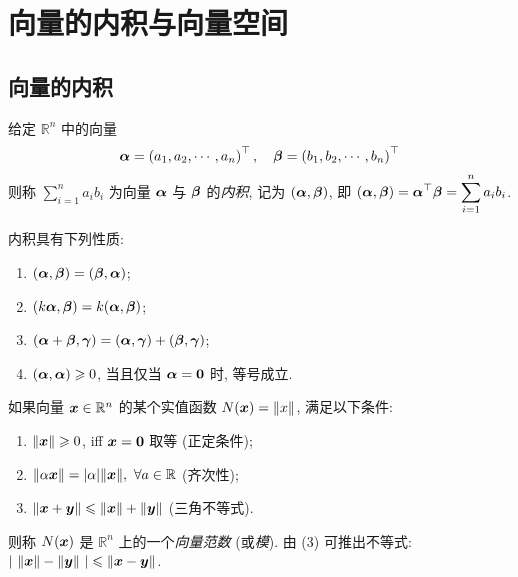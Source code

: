 \section{向量的内积与向量空间}

\subsection{向量的内积}

\begin{definition}[向量的内积]
    给定 $ \mathbb{R}^{n} $ 中的向量
    $$\vb*{\alpha}=\left(a_{1}, a_{2}, \cdots, a_{n}\right)^{\top}, \quad \vb*{\beta}=\left(b_{1}, b_{2}, \cdots, b_{n}\right)^{\top}$$
    则称 $\displaystyle \sum_{i=1}^{n} a_{i} b_{i} $ 为向量 $ \vb*{\alpha} $ 与 $ \vb*{\beta} $ 的\textit{内积}, 记为 $ (\vb*{\alpha}, \vb*{\beta}) $, 即 $ \displaystyle(\vb*{\alpha}, \vb*{\beta})=\vb*{\alpha}^{\top} \vb*{\beta}=\sum_{i=1}^{n} a_{i} b_{i} $.
\end{definition}

内积具有下列性质:
\begin{enumerate}[label=(\arabic{*})]
    \item $(\vb*{\alpha}, \vb*{\beta})=(\vb*{\beta}, \vb*{\alpha}) $;
    \item $(k \vb*{\alpha}, \vb*{\beta})=k(\vb*{\alpha}, \vb*{\beta}) $;
    \item $(\vb*{\alpha}+\vb*{\beta}, \vb*{\gamma})=(\vb*{\alpha}, \vb*{\gamma})+(\vb*{\beta}, \vb*{\gamma}) $;
    \item $(\vb*{\alpha}, \vb*{\alpha}) \geqslant 0 $, 当且仅当 $ \vb*{\alpha}=\vb*{0} $ 时, 等号成立.
\end{enumerate}

\begin{definition}[向量的范数]
    如果向量 $\vb*{x}\in \mathbb{R}^{n}$ 的某个实值函数 $N(\vb*{x})=\norm{x}$, 满足以下条件:
    \begin{enumerate}[label=(\arabic{*})]
        \item $\norm{\vb*{x}}\geqslant 0$, iff $\vb*{x}=\vb*{0}$ 取等 (正定条件);
        \item $\norm{\alpha\vb*{x}}=|\alpha|\norm{\vb*{x}},~\forall a\in \mathbb{R}$ (齐次性);
        \item $\norm{\vb*{x}+\vb*{y}}\leqslant \norm{\vb*{x}}+\norm{\vb*{y}}$ (三角不等式).
    \end{enumerate}
    则称 $N(\vb*{x})$ 是 $\mathbb{R}^{n}$ 上的一个\textit{向量范数} (或\textit{模}). 由 (3) 可推出不等式: $|~\norm{\vb*{x}}-\norm{\vb*{y}}~|\leqslant \norm{\vb*{x}-\vb*{y}}$.
\end{definition}

